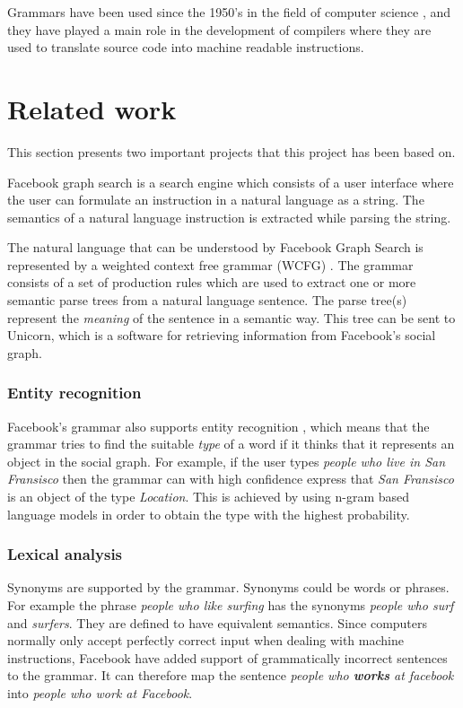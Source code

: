 Grammars have been used since the 1950's in the field of computer science \cite{DBLP:journals/cacm/Backus78}, and they have played a main role in the development of compilers where they are used to translate source code into machine readable instructions.

\section{Related work}
This section presents two important projects that this project has been based on.

Facebook graph search \cite{unicorn} is a search engine which consists of a user interface where the user can formulate an instruction in a natural language as a string. The semantics of a natural language instruction is extracted while parsing the string.

The natural language that can be understood by Facebook Graph Search is represented by a weighted context free grammar (WCFG) \cite{li:2013}. The grammar consists of a set of production rules which are used to extract one or more semantic parse trees from a natural language sentence. The parse tree(s) represent the \emph{meaning} of the sentence in a semantic way. This tree can be sent to Unicorn, which is a software for retrieving information from Facebook's social graph. \cite{unicorn}

\subsubsection{Entity recognition}
Facebook's grammar also supports entity recognition \cite{citation-needed}, which means that the grammar tries to find the suitable \emph{type} of a word if it thinks that it represents an object in the social graph. For example, if the user types \emph{people who live in San Fransisco} then the grammar can with high confidence express that \emph{San Fransisco} is an object of the type \emph{Location}. This is achieved by using n-gram based language models in order to obtain the type with the highest probability.

\subsubsection{Lexical analysis}
Synonyms are supported by the grammar. Synonyms could be words or phrases. For example the phrase \emph{people who like surfing} has the synonyms \emph{people who surf} and \emph{surfers}. They are defined to have equivalent semantics.
\newline
\newline
Since computers normally only accept perfectly correct input when dealing with machine instructions, Facebook have added support of grammatically incorrect sentences to the grammar. It can therefore map the sentence \emph{people who \textbf{works} at facebook} into \emph{people who work at Facebook}.

